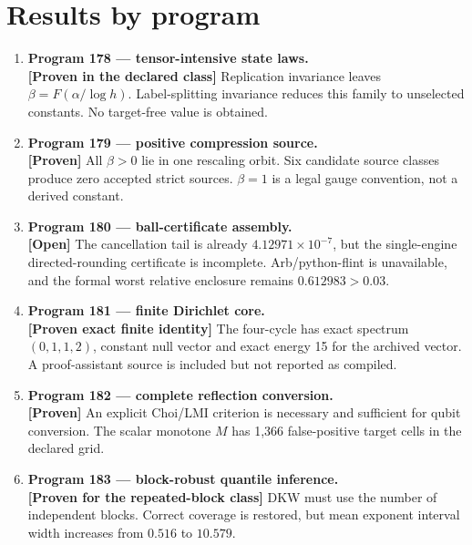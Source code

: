 \documentclass[11pt,a4paper,openany]{report}
\newcommand{\statusProven}{\textcolor{fingreen}{[Proven]}}
\newcommand{\statusOpen}{\textcolor{finviolet}{[Open]}}
\begin{document}
\section{Results by program}

\begin{enumerate}
\item 
\textbf{Program 178 --- tensor-intensive state laws.}\\
\textbf{[Proven in the declared class]} Replication invariance leaves \(\beta=F(\alpha/\log h)\). Label-splitting invariance reduces this family to unselected constants. No target-free value is obtained.

\item 
\textbf{Program 179 --- positive compression source.}\\
\textbf{\statusProven{}} All \(\beta>0\) lie in one rescaling orbit. Six candidate source classes produce zero accepted strict sources. \(\beta=1\) is a legal gauge convention, not a derived constant.

\item 
\textbf{Program 180 --- ball-certificate assembly.}\\
\textbf{\statusOpen{}} The cancellation tail is already \(4.12971\times10^{-7}\), but the single-engine directed-rounding certificate is incomplete. Arb/\allowbreak{}python-flint is unavailable, and the formal worst relative enclosure remains \(0.612983>0.03\).

\item 
\textbf{Program 181 --- finite Dirichlet core.}\\
\textbf{[Proven exact finite identity]} The four-cycle has exact spectrum \((0,1,1,2)\), constant null vector and exact energy 15 for the archived vector. A proof-assistant source is included but not reported as compiled.

\item 
\textbf{Program 182 --- complete reflection conversion.}\\
\textbf{\statusProven{}} An explicit Choi/\allowbreak{}LMI criterion is necessary and sufficient for qubit conversion. The scalar monotone \(M\) has 1,366 false-positive target cells in the declared grid.

\item 
\textbf{Program 183 --- block-robust quantile inference.}\\
\textbf{[Proven for the repeated-block class]} DKW must use the number of independent blocks. Correct coverage is restored, but mean exponent interval width increases from \(0.516\) to \(10.579\).


\end{enumerate}
\end{document}
